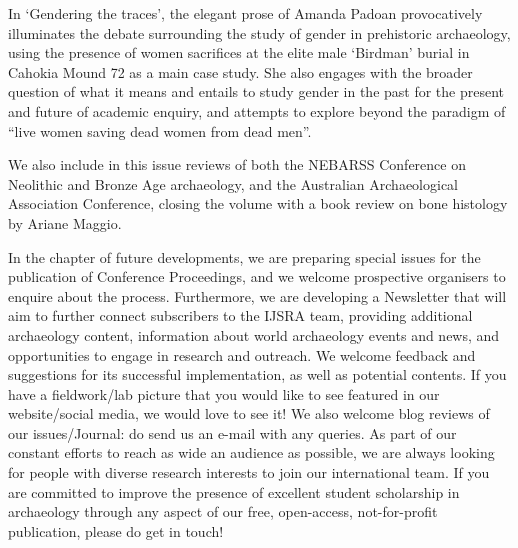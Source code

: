 In ‘Gendering the traces’, the elegant prose of Amanda Padoan provocatively illuminates the debate surrounding the study of gender in prehistoric archaeology, using the presence of women sacrifices at the elite male ‘Birdman’ burial in Cahokia Mound 72 as a main case study. She also engages with the broader question of what it means and entails to study gender in the past for the present and future of academic enquiry, and attempts to explore beyond the paradigm of “live women saving dead women from dead men”.

We also include in this issue reviews of both the NEBARSS Conference on Neolithic and Bronze Age archaeology, and the Australian Archaeological Association Conference, closing the volume with a book review on bone histology by Ariane Maggio.

In the chapter of future developments, we are preparing special issues for the publication of Conference Proceedings, and we welcome prospective organisers to enquire about the process. Furthermore, we are developing a Newsletter that will aim to further connect subscribers to the IJSRA team, providing additional archaeology content, information about world archaeology events and news, and opportunities to engage in research and outreach. We welcome feedback and suggestions for its successful implementation, as well as potential contents. If you have a fieldwork/lab picture that you would like to see featured in our website/social media, we would love to see it! We also welcome blog reviews of our issues/Journal: do send us an e-mail with any queries.
As part of our constant efforts to reach as wide an audience as possible, we are always looking for people with diverse research interests to join our international team. If you are committed to improve the presence of excellent student scholarship in archaeology through any aspect of our free, open-access, not-for-profit publication, please do get in touch!

\IJSRAclosing%
